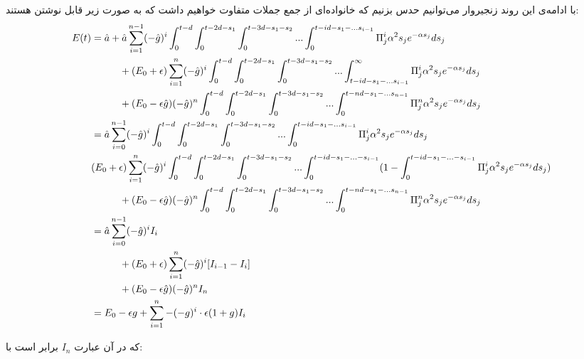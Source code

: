 \begin{landscape}
با ادامه‌ی این روند زنجیروار می‌توانیم حدس بزنیم که خانواده‌ای از جمع جملات متفاوت خواهیم داشت که به صورت زیر قابل نوشتن هستند:
\begin{align}
	E(t) &= \hat{a} + \hat{a} \sum^{n - 1}_{i=1} (-\hat{g})^i \int_{0}^{t - d} \int_{0}^{t - 2d - s_1} \int_{0}^{t - 3d - s_1 - s_2} ... \int_{0}^{t - id - s_1 - ... s_{i-1}} \Pi^i_j \alpha^2 s_j e^{-\alpha s_j} ds_j \\
	&\hspace{1 cm} + (E_0 + \epsilon) \sum^{n}_{i=1} (-\hat{g})^i \int_{0}^{t - d} \int_{0}^{t - 2d - s_1} \int_{0}^{t - 3d - s_1 - s_2} ... \int_{t - id - s_1 - ... s_{i-1}}^{\infty} \Pi^i_j \alpha^2 s_j e^{-\alpha s_j} ds_j \\
	&\hspace{1 cm} + (E_0 - \epsilon \hat{g}) (-\hat{g})^n \int_{0}^{t - d} \int_{0}^{t - 2d - s_1} \int_{0}^{t - 3d - s_1 - s_2} ... \int_{0}^{t - nd - s_1 - ... s_{n-1}} \Pi^n_j \alpha^2 s_j e^{-\alpha s_j} ds_j \\
	&= \hat{a} \sum^{n - 1}_{i=0} (-\hat{g})^i \int_{0}^{t - d} \int_{0}^{t - 2d - s_1} \int_{0}^{t - 3d - s_1 - s_2} ... \int_{0}^{t - id - s_1 - ... s_{i-1}} \Pi^i_j \alpha^2 s_j e^{-\alpha s_j} ds_j \\
	& (E_0 + \epsilon) \sum^{n}_{i=1} (-\hat{g})^i \int_{0}^{t - d} \int_{0}^{t - 2d - s_1} \int_{0}^{t - 3d - s_1 - s_2} ... \int_0^{t - id - s_1 - ... - s_{i-1}} (1 - \int_{0}^{t - id - s_1 - ... - s_{i-1}} \Pi^i_j \alpha^2 s_j e^{-\alpha s_j} ds_j )\\
	&\hspace{1 cm} + (E_0 - \epsilon \hat{g}) (-\hat{g})^n \int_{0}^{t - d} \int_{0}^{t - 2d - s_1} \int_{0}^{t - 3d - s_1 - s_2} ... \int_{0}^{t - nd - s_1 - ... s_{n-1}} \Pi^n_j \alpha^2 s_j e^{-\alpha s_j} ds_j\\
	&= \hat{a} \sum^{n - 1}_{i=0} (-\hat{g})^i I_i\\
	&\hspace{1 cm} + (E_0 + \epsilon) \sum^{n}_{i=1} (-\hat{g})^i [I_{i-1} - I_{i}]  \\
	&\hspace{1 cm} + (E_0 - \epsilon \hat{g}) (-\hat{g})^n I_n \\
	&= E_0 - \epsilon g + \sum^{n}_{i=1} - (-g)^i \cdot \epsilon(1+g) I_{i}
	\label{eq:final_equation_e}
\end{align}
\end{landscape}
که در آن عبارت 
$I_n$
برابر است با:

